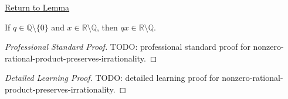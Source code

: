 \newpage
{}
\label{prf:nonzero-rational-product-preserves-irrationality}

\begin{remark*}[Return]
\hyperref[lem:nonzero-rational-product-preserves-irrationality]{Return to Lemma}
\end{remark*}

\begin{lemma*}
If $q\in\mathbb{Q}\setminus\{0\}$ and
$x\in\mathbb{R}\setminus\mathbb{Q}$, then
$qx\in\mathbb{R}\setminus\mathbb{Q}$.
\end{lemma*}

\begin{proof}[Professional Standard Proof]
\LRAProofBodyStart
TODO: professional standard proof for nonzero-rational-product-preserves-irrationality.
\end{proof}

\begin{proof}[Detailed Learning Proof]
\LRAProofBodyStart
TODO: detailed learning proof for nonzero-rational-product-preserves-irrationality.
\end{proof}

\begin{remark*}
\end{remark*}

\NoLocalDependencies

\clearpage
